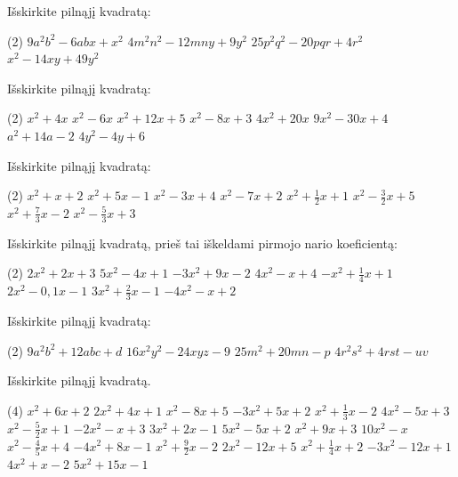 \documentclass[11pt,a4paper]{scrartcl}
\begin{document}
\begin{problem}
Išskirkite pilnąjį kvadratą:
\begin{tasks}[label={(\arabic*)}, label-offset=0.9em](2)
	\task $9a^2b^2-6abx+x^2$
	\task $4m^2n^2-12mny+9y^2$
	\task $25p^2q^2-20pqr+4r^2$
	\task $x^2-14xy+49y^2$
\end{tasks}
\end{problem}

\begin{problem}
Išskirkite pilnąjį kvadratą:
\begin{tasks}[label={(\arabic*)}, label-offset=0.9em](2)
	\task $x^2+4x$
	\task $x^2-6x$
	\task $x^2+12x+5$
	\task $x^2-8x+3$
	\task $4x^2+20x$
	\task $9x^2-30x+4$
	\task $a^2+14a-2$
	\task $4y^2-4y+6$
\end{tasks}
\end{problem}

\begin{problem}
Išskirkite pilnąjį kvadratą:
\begin{tasks}[label={(\arabic*)}, label-offset=0.9em](2)
	\task $x^2+x+2$
	\task $x^2+5x-1$
	\task $x^2-3x+4$
	\task $x^2-7x+2$
	\task $x^2+\frac{1}{2}x+1$
	\task $x^2-\frac{3}{2}x+5$
	\task $x^2+\frac{7}{3}x-2$
	\task $x^2-\frac{5}{3}x+3$
\end{tasks}
\end{problem}

\begin{problem}
Išskirkite pilnąjį kvadratą, prieš tai iškeldami pirmojo nario koeficientą:
\begin{tasks}[label={(\arabic*)}, label-offset=0.9em](2)
	\task $2x^2+2x+3$
	\task $5x^2-4x+1$
	\task $-3x^2+9x-2$
	\task $4x^2-x+4$
	\task $-x^2+ \frac{1}{4} x+1$
	\task $2x^2-0,1x-1$
	\task $3x^2+ \frac{2}{3} x-1$
	\task $-4x^2-x+2$
\end{tasks}
\end{problem}
\newpage
\begin{problem}
Išskirkite pilnąjį kvadratą:
\begin{tasks}[label={(\arabic*)}, label-offset=0.9em](2)
	\task $9a^2b^2+12abc+d$
	\task $16x^2y^2-24xyz-9$
	\task $25m^2+20mn-p$
	\task $4r^2s^2+4rst-uv$
\end{tasks}
\end{problem}

\begin{problem}
Išskirkite pilnąjį kvadratą.
\begin{tasks}[label={(\arabic*)}, label-offset=0.9em](4)
	\task $x^2+6x+2$
	\task $2x^2+4x+1$
	\task $x^2-8x+5$
	\task $-3x^2+5x+2$
	\task $x^2+\frac{1}{3}x-2$
	\task $4x^2-5x+3$
	\task $x^2-\frac{5}{2}x+1$
	\task $-2x^2-x+3$
	\task $3x^2+2x-1$
	\task $5x^2-5x+2$
	\task $x^2+9x+3$
	\task $10x^2-x$
	\task $x^2-\frac{4}{5}x+4$
	\task $-4x^2+8x-1$
	\task $x^2+\frac{9}{2}x-2$
	\task $2x^2-12x+5$
	\task $x^2+\frac{1}{4}x+2$
	\task $-3x^2-12x+1$
	\task $4x^2+x-2$
	\task $5x^2+15x-1$
\end{tasks}
\end{problem}
\end{document}
